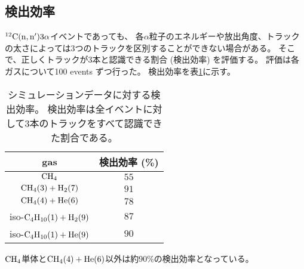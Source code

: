 \documentclass[../master]{subfiles}
\begin{document}
\subsection{検出効率}
${}^{12}{\rm C}({\rm n},{\rm n}')3\alpha$イベントであっても、
各$\alpha$粒子のエネルギーや放出角度、トラックの太さによっては3つのトラックを区別することができない場合がある。
そこで、正しくトラックが3本と認識できる割合 (検出効率) を評価する。
評価は各ガスについて100 events ずつ行った。
検出効率を表\ref{tab::detection_efficiency}に示す。
\begin{table}
  \centering
  \caption[シミュレーションデータに対する検出効率。]
          {シミュレーションデータに対する検出効率。
            検出効率は全イベントに対して3本のトラックをすべて認識できた割合である。}
  \label{tab::detection_efficiency}
  \begin{tabular}{cc}
    \toprule
    gas & 検出効率 (\%)\\
    \midrule
    $\rm CH_{4}$ & $55$ \\%
    $\rm CH_{4} (3) + H_{2} (7)$ & $91$ \\%
    $\rm CH_{4} (4) + He (6)$ & $78$ \\%
    iso-$\rm C_{4}H_{10} (1) + H_{2} (9)$ & $87$ \\%
    iso-$\rm C_{4}H_{10} (1) + He (9)$ & $90$ \\%
    \bottomrule
  \end{tabular}
\end{table}
$\rm CH_{4}$単体と$\rm CH_{4} (4) + He (6)$以外は約90\%の検出効率となっている。

\end{document}
